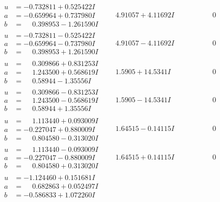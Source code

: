 \documentclass[1p]{elsarticle_modified}
\theoremstyle{definition}
\begin{document}
$$\begin{array}{c|c|c}
\begin{aligned}
u &= -0.732811 + 0.525422 I \\
a &= -0.659964 + 0.737980 I \\
b &= \phantom{-}0.398953 - 1.261590 I\end{aligned}
 & \phantom{-}4.91057 + 4.11692 I & \phantom{-0.000000 } 0 \\ \hline\begin{aligned}
u &= -0.732811 - 0.525422 I \\
a &= -0.659964 - 0.737980 I \\
b &= \phantom{-}0.398953 + 1.261590 I\end{aligned}
 & \phantom{-}4.91057 - 4.11692 I & \phantom{-0.000000 } 0 \\ \hline\begin{aligned}
u &= \phantom{-}0.309866 + 0.831253 I \\
a &= \phantom{-}1.243500 + 0.568619 I \\
b &= \phantom{-}0.58944 - 1.35556 I\end{aligned}
 & \phantom{-}1.5905 + 14.5341 I & \phantom{-0.000000 } 0 \\ \hline\begin{aligned}
u &= \phantom{-}0.309866 - 0.831253 I \\
a &= \phantom{-}1.243500 - 0.568619 I \\
b &= \phantom{-}0.58944 + 1.35556 I\end{aligned}
 & \phantom{-}1.5905 - 14.5341 I & \phantom{-0.000000 } 0 \\ \hline\begin{aligned}
u &= \phantom{-}1.113440 + 0.093009 I \\
a &= -0.227047 + 0.880009 I \\
b &= \phantom{-}0.804580 - 0.313020 I\end{aligned}
 & \phantom{-}1.64515 - 0.14115 I & \phantom{-0.000000 } 0 \\ \hline\begin{aligned}
u &= \phantom{-}1.113440 - 0.093009 I \\
a &= -0.227047 - 0.880009 I \\
b &= \phantom{-}0.804580 + 0.313020 I\end{aligned}
 & \phantom{-}1.64515 + 0.14115 I & \phantom{-0.000000 } 0 \\ \hline\begin{aligned}
u &= -1.124460 + 0.151681 I \\
a &= \phantom{-}0.682863 + 0.052497 I \\
b &= -0.586833 + 1.072260 I\end{aligned}

\end{array}$$
\end{document}
